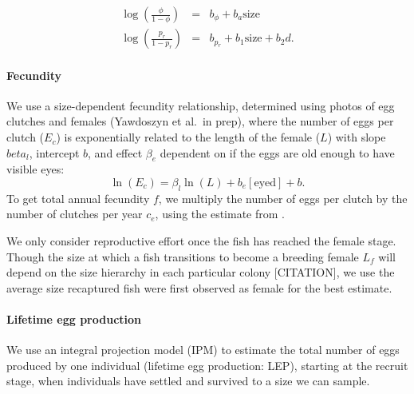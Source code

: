\documentclass[12pt, oneside]{article}   	%
\begin{document}
\begin{eqnarray}
\log(\frac{\phi}{1-\phi}) &=& b_\phi + b_a\text{size} \\
\log(\frac{p_r}{1-p_r}) &=& b_{p_r} + b_1\text{size} + b_2d. \label{EQN_Survival}
\end{eqnarray}

\paragraph*{Fecundity}

We use a size-dependent fecundity relationship, determined using photos of egg clutches and females (Yawdoszyn et al.\ in prep), where the number of eggs per clutch ($E_c$) is exponentially related to the length of the female ($L$) with slope $beta_l$, intercept $b$, and effect $\beta_e$ dependent on if the eggs are old enough to have visible eyes: 
\begin{equation} %
\ln(E_c) = \beta_l\ln(L) + b_e[\text{eyed}] + b. \label{EQN_Fec}
\end{equation}
To get total annual fecundity $f$, we multiply the number of eggs per clutch by the number of clutches per year $c_e$, using the estimate from \cite{holtswarth2017fecundity}.

We only consider reproductive effort once the fish has reached the female stage. Though the size at which a fish transitions to become a breeding female $L_f$ will depend on the size hierarchy in each particular colony [CITATION], we use the average size recaptured fish were first observed as female for the best estimate. 


\paragraph*{Lifetime egg production}
We use an integral projection model (IPM) \citep[e.g.][]{rees2014building} to estimate the total number of eggs produced by one individual (lifetime egg production: LEP), starting at the recruit stage, when individuals have settled and survived to a size we can sample.
\end{document}
